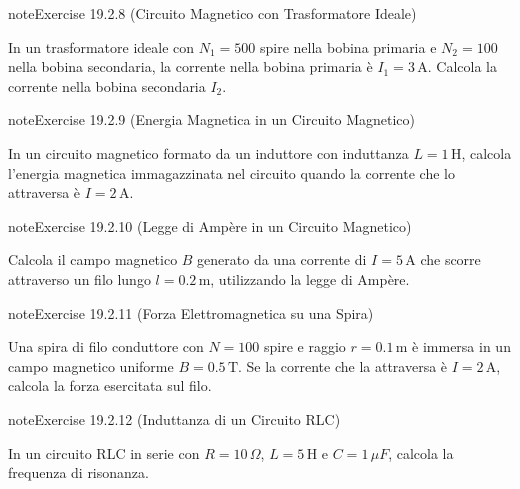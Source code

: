 \documentclass[letterpaper,10pt,italian]{jupyterBook}
\begin{document}
\begin{sphinxadmonition}{note}{Exercise 19.2.8 (Circuito Magnetico con Trasformatore Ideale)}



\sphinxAtStartPar
In un trasformatore ideale con \(N_1 = 500\) spire nella bobina primaria e \(N_2 = 100\) nella bobina secondaria, la corrente nella bobina primaria è \(I_1 = 3 \, \text{A}\). Calcola la corrente nella bobina secondaria \(I_2\).
\end{sphinxadmonition}
 \label{exercise:ch/electromagnetism/circuits-magnetic-problems-exercise-8}

\begin{sphinxadmonition}{note}{Exercise 19.2.9 (Energia Magnetica in un Circuito Magnetico)}



\sphinxAtStartPar
In un circuito magnetico formato da un induttore con induttanza \(L = 1 \, \text{H}\), calcola l’energia magnetica immagazzinata nel circuito quando la corrente che lo attraversa è \(I = 2 \, \text{A}\).
\end{sphinxadmonition}
 \label{exercise:ch/electromagnetism/circuits-magnetic-problems-exercise-9}

\begin{sphinxadmonition}{note}{Exercise 19.2.10 (Legge di Ampère in un Circuito Magnetico)}



\sphinxAtStartPar
Calcola il campo magnetico \(B\) generato da una corrente di \(I = 5 \, \text{A}\) che scorre attraverso un filo lungo \(l = 0.2 \, \text{m}\), utilizzando la legge di Ampère.
\end{sphinxadmonition}
 \label{exercise:ch/electromagnetism/circuits-magnetic-problems-exercise-10}

\begin{sphinxadmonition}{note}{Exercise 19.2.11 (Forza Elettromagnetica su una Spira)}



\sphinxAtStartPar
Una spira di filo conduttore con \(N = 100\) spire e raggio \(r = 0.1 \, \text{m}\) è immersa in un campo magnetico uniforme \(B = 0.5 \, \text{T}\). Se la corrente che la attraversa è \(I = 2 \, \text{A}\), calcola la forza esercitata sul filo.
\end{sphinxadmonition}
 \label{exercise:ch/electromagnetism/circuits-magnetic-problems-exercise-11}

\begin{sphinxadmonition}{note}{Exercise 19.2.12 (Induttanza di un Circuito RLC)}



\sphinxAtStartPar
In un circuito RLC in serie con \(R = 10 \, \Omega\), \(L = 5 \, \text{H}\) e \(C = 1 \, \mu F\), calcola la frequenza di risonanza.
\end{sphinxadmonition}
 \label{exercise:ch/electromagnetism/circuits-magnetic-problems-exercise-12}
\end{document}
